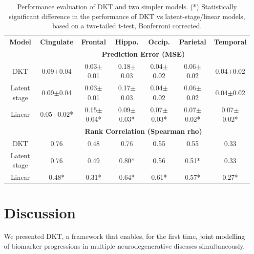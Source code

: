 \documentclass{llncs}
\begin{document}
\newcommand{\cw}{c}



\begin{table}
\centering
\fontsize{8}{10}\selectfont
\begin{tabular}{c | c c c c c c}
\textbf{Model} & \textbf{Cingulate} & \textbf{Frontal} & \textbf{Hippo.} & \textbf{Occip.} & \textbf{Parietal} & \textbf{Temporal}\\
& \multicolumn{6}{c}{\textbf{Prediction Error (MSE)}}\\
DKT & 0.09$\pm$0.04 & 0.03$\pm$0.01 & 0.18$\pm$0.03 & 0.04$\pm$0.02 & 0.06$\pm$0.02 & 0.04$\pm$0.02\\
Latent stage & 0.09$\pm$0.04 & 0.03$\pm$0.01 & 0.17$\pm$0.03 & 0.04$\pm$0.02 & 0.06$\pm$0.02 & 0.04$\pm$0.02\\
Linear & 0.05$\pm$0.02* & 0.15$\pm$0.04* & 0.09$\pm$0.03* & 0.07$\pm$0.03* & 0.07$\pm$0.02* & 0.07$\pm$0.02*\\
& \multicolumn{6}{c}{\textbf{Rank Correlation (Spearman rho)}}\\
DKT  & 0.76  & 0.48  & 0.76  & 0.55  & 0.55  & 0.33 \\
Latent stage & 0.76  & 0.49  & 0.80*  & 0.56  & 0.51*  & 0.33 \\
Linear & 0.48*  & 0.31*  & 0.64*  & 0.61*  & 0.57*  & 0.27* \\
\end{tabular}
\caption[Performance evaluation of DKT and two simpler models]{Performance evaluation of DKT and two simpler models. (*) Statistically significant difference in the performance of DKT vs latent-stage/linear models, based on a two-tailed t-test, Bonferroni corrected.}
\label{sec:dktPerfMetrics}
\end{table}



\section{Discussion}
\label{sec:dktDis}

We presented DKT, a framework that enables, for the first time, joint modelling of biomarker progressions in multiple neurodegenerative diseases simultaneously. 

\end{document}
